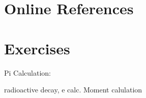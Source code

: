 

\section{Online References}
\label{sec:Online_Refernces}


\section{Exercises}
Pi Calculation:


radioactive decay, e calc.
Moment calulation


\nocite{FLANAGAN-EXAMPLES}
\nocite{GOSLING}






